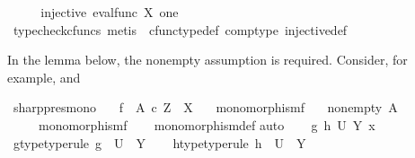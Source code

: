\begin{isabellebody}
\ \ \isamarkupfalse%
\ \isamarkupfalse%
\ {\isachardoublequoteopen}injective\ {\isacharparenleft}{\kern0pt}eval{\isacharunderscore}{\kern0pt}func\ X\ one{\isacharparenright}{\kern0pt}{\isachardoublequoteclose}\isanewline
\ \ \ \ \isamarkupfalse%
\ {\isacharparenleft}{\kern0pt}typecheck{\isacharunderscore}{\kern0pt}cfuncs{\isacharcomma}{\kern0pt}\ metis\ \ cfunc{\isacharunderscore}{\kern0pt}type{\isacharunderscore}{\kern0pt}def\ comp{\isacharunderscore}{\kern0pt}type\ injective{\isacharunderscore}{\kern0pt}def{\isacharparenright}{\kern0pt}\isanewline
{}\isamarkupfalse%
%
\endisatagproof
{\isafoldproof}%
%
\isadelimproof
%
\endisadelimproof
%
\begin{isamarkuptext}%
In the lemma below, the nonempty assumption is required.
      Consider, for example,  and %
\end{isamarkuptext}\isamarkuptrue%
\isamarkupfalse%
\ sharp{\isacharunderscore}{\kern0pt}pres{\isacharunderscore}{\kern0pt}mono{\isacharcolon}{\kern0pt}\isanewline
\ \ \ {\isachardoublequoteopen}f\ {\isacharcolon}{\kern0pt}\ A\ {\isasymtimes}\isactrlsub c\ Z\ {\isasymrightarrow}\ X{\isachardoublequoteclose}\isanewline
\ \ \ {\isachardoublequoteopen}monomorphism{\isacharparenleft}{\kern0pt}f{\isacharparenright}{\kern0pt}{\isachardoublequoteclose}\isanewline
\ \ \ {\isachardoublequoteopen}nonempty\ A{\isachardoublequoteclose}\isanewline
\ \ \ \ \ {\isachardoublequoteopen}monomorphism{\isacharparenleft}{\kern0pt}f\isactrlsup {\isasymsharp}{\isacharparenright}{\kern0pt}{\isachardoublequoteclose}\isanewline
%
\isadelimproof
\ \ %
\endisadelimproof
%
\isatagproof
{}\isamarkupfalse%
\ monomorphism{\isacharunderscore}{\kern0pt}def{}\isanewline
{}\isamarkupfalse%
{\isacharparenleft}{\kern0pt}auto{\isacharparenright}{\kern0pt}\isanewline
\ \ \isamarkupfalse%
\ g\ h\ U\ Y\ x\isanewline
\ \ \isamarkupfalse%
\ g{\isacharunderscore}{\kern0pt}type{\isacharbrackleft}{\kern0pt}type{\isacharunderscore}{\kern0pt}rule{\isacharbrackright}{\kern0pt}{\isacharcolon}{\kern0pt}\ {\isachardoublequoteopen}g\ {\isacharcolon}{\kern0pt}\ U\ {\isasymrightarrow}\ Y{\isachardoublequoteclose}\isanewline
\ \ \isamarkupfalse%
\ h{\isacharunderscore}{\kern0pt}type{\isacharbrackleft}{\kern0pt}type{\isacharunderscore}{\kern0pt}rule{\isacharbrackright}{\kern0pt}{\isacharcolon}{\kern0pt}\ {\isachardoublequoteopen}h\ {\isacharcolon}{\kern0pt}\ U\ {\isasymrightarrow}\ Y{\isachardoublequoteclose}\isanewline

\end{isabellebody}
